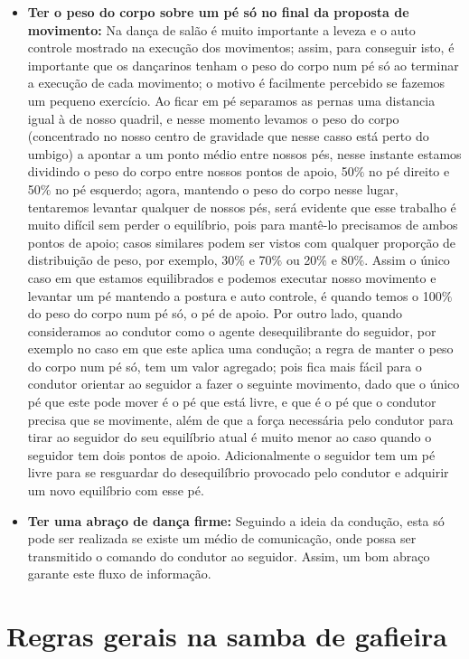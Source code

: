 \begin{itemize}
\item \textbf{Ter o peso do corpo sobre um pé só no final da proposta de movimento:} 
Na dança de salão é muito importante a leveza e o auto controle mostrado na 
execução dos movimentos; assim, para conseguir isto, é importante que os dançarinos
tenham o peso do corpo num pé só ao terminar a execução de cada movimento; o motivo
é facilmente percebido se fazemos um pequeno exercício. Ao ficar em pé separamos as
pernas uma distancia igual à de nosso quadril, e nesse momento levamos o peso do corpo
(concentrado no nosso centro de gravidade que nesse casso está perto do umbigo) a
apontar a um ponto médio entre nossos pés, nesse instante estamos dividindo o peso do corpo
entre nossos pontos de apoio, 50$\%$ no pé direito e 50$\%$ no pé esquerdo; agora, mantendo o peso
do corpo nesse lugar, tentaremos levantar qualquer de nossos pés, será evidente
que esse trabalho é muito difícil sem perder o equilíbrio, pois para mantê-lo
precisamos de ambos pontos de apoio; casos similares podem ser vistos com qualquer proporção de distribuição de peso,
por exemplo, 30$\%$ e 70$\%$ ou 20$\%$ e 80$\%$. Assim o único caso em que estamos
equilibrados e podemos executar nosso movimento e levantar um pé 
mantendo a postura e auto controle, é quando
temos o 100$\%$ do peso do corpo num pé só, o pé de apoio. 
Por outro lado, quando consideramos ao condutor como o agente desequilibrante do seguidor, por exemplo no caso
em que este aplica uma condução;
a regra de manter o peso do corpo num pé só, tem um valor agregado; 
pois fica mais fácil para o condutor orientar
ao seguidor a fazer o seguinte movimento, dado que o único pé que este pode mover é o pé
que está livre, e que é o pé que o condutor precisa que se movimente, 
além de que a força necessária pelo condutor para tirar ao seguidor do seu equilíbrio 
atual é muito menor ao caso quando o seguidor tem dois pontos de apoio.
Adicionalmente o seguidor tem um pé livre para se resguardar do desequilíbrio provocado pelo 
condutor e adquirir um novo equilíbrio com esse pé.

\item \textbf{Ter uma abraço de dança firme:} Seguindo a ideia da condução, esta só pode
ser realizada se existe um médio de comunicação, onde possa ser transmitido
o comando do condutor ao seguidor. Assim, um bom abraço garante este
fluxo de informação.
\end{itemize}

\section{Regras gerais na samba de gafieira}


